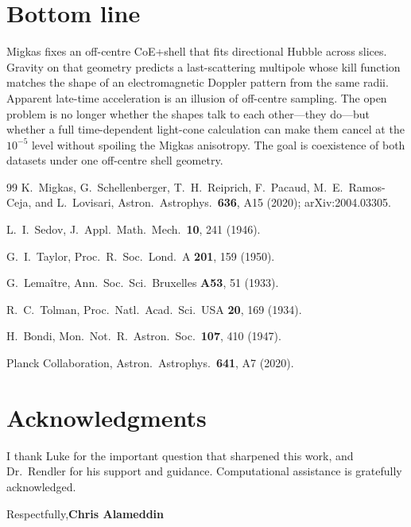 \documentclass[11pt]{article}
\begin{document}
\section{Bottom line}
Migkas fixes an off-centre CoE+shell that fits directional Hubble across slices. Gravity on that geometry predicts a last-scattering multipole whose kill function matches the shape of an electromagnetic Doppler pattern from the same radii. Apparent late-time acceleration is an illusion of off-centre sampling. The open problem is no longer whether the shapes talk to each other---they do---but whether a full time-dependent light-cone calculation can make them cancel at the \(10^{-5}\) level without spoiling the Migkas anisotropy. The goal is coexistence of both datasets under one off-centre shell geometry.

\begin{thebibliography}{99}
K.~Migkas, G.~Schellenberger, T.~H.~Reiprich, F.~Pacaud, M.~E.~Ramos-Ceja, and L.~Lovisari,
Astron.\ Astrophys.\ \textbf{636}, A15 (2020); arXiv:2004.03305.

L.~I.~Sedov,
J.\ Appl.\ Math.\ Mech.\ \textbf{10}, 241 (1946).

G.~I.~Taylor,
Proc.\ R.\ Soc.\ Lond.\ A \textbf{201}, 159 (1950).

G.~Lema\^itre,
Ann.\ Soc.\ Sci.\ Bruxelles \textbf{A53}, 51 (1933).

R.~C.~Tolman,
Proc.\ Natl.\ Acad.\ Sci.\ USA \textbf{20}, 169 (1934).

H.~Bondi,
Mon.\ Not.\ R.\ Astron.\ Soc.\ \textbf{107}, 410 (1947).

Planck Collaboration,
Astron.\ Astrophys.\ \textbf{641}, A7 (2020).

\end{thebibliography}

\section*{Acknowledgments}
I thank Luke for the important question that sharpened this work, and Dr.~Rendler for his support and guidance. Computational assistance is gratefully acknowledged.

\noindent Respectfully,\quad\textbf{Chris Alameddin}


\clearpage
\appendix
\setcounter{figure}{0}
\setcounter{table}{0}
\renewcommand{\thefigure}{A\arabic{figure}}
\renewcommand{\thetable}{A\arabic{table}}
\renewcommand{\theHfigure}{A\arabic{figure}}
\renewcommand{\theHtable}{A\arabic{table}}
\end{document}
